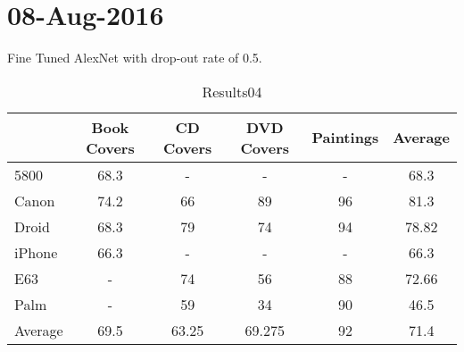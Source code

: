 \section{08-Aug-2016}
Fine Tuned AlexNet with drop-out rate of 0.5. 

\begin{table*}
{\setlength{\tabcolsep}{14pt}
\caption{Results04}
\begin{center}
  \begin{tabular}{ |l | c | c | c | c | c |}
    \hline
    		   &Book Covers & CD Covers & DVD Covers & Paintings & Average \\ \hline 
    5800   & 68.3       & -         & -          & -       & 68.3  \\ \hline 
    Canon  & 74.2       & 66        & 89         & 96      & 81.3  \\ \hline 
    Droid  & 68.3       & 79        & 74         & 94      & 78.82 \\ \hline 
    iPhone & 66.3       & -         & -          & -       & 66.3  \\ \hline 
    E63    & -          & 74	    & 56         & 88      & 72.66    \\ \hline 
    Palm   & -          & 59        & 34         & 90      & 46.5  \\ \hline
    Average& 69.5       & 63.25     & 69.275     & 92      & 71.4 \\ \hline

  \end{tabular}
\end{center}
\label{results04}}
\end{table*}
